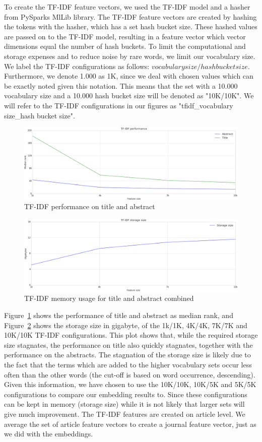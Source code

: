 \documentclass[../../Thesis.tex]{subfiles}
\begin{document}
\clearpage
{}
To create the TF-IDF feature vectors, we used the TF-IDF model and a hasher from PySparks MlLib library. The TF-IDF feature vectors are created by hashing the tokens with the hasher, which has a set hash bucket size. These hashed values are passed on to the TF-IDF model, resulting in a feature vector which vector dimensions equal the number of hash buckets. To limit the computational and storage expenses and to reduce noise by rare words, we limit our vocabulary size.
We label the TF-IDF configurations as follows: $vocabulary size/hash bucket size$. Furthermore, we denote 1.000 as 1K, since we deal with chosen values which can be exactly noted given this notation. This means that the set with a 10.000 vocabulary size and a 10.000 hash bucket size will be denoted as "10K/10K". We will refer to the TF-IDF configurations in our figures as "tfidf\_vocabulary size\_hash bucket size".
\begin{figure}[hbt]
\includegraphics[width=5in]{Plots/tfidf_selection_plot_performance}
\caption{TF-IDF performance on title and abstract}\label{figure:tfidfPerformance}
\end{figure}
\begin{figure}[hbt]
\includegraphics[width=5in]{Plots/tfidf_selection_plot_memory}
\caption{TF-IDF memory usage for title and abstract combined}\label{figure:tfidfMemory}
\end{figure}
\FloatBarrier
Figure~\ref{figure:tfidfPerformance} shows the performance of title and abstract as median rank, and Figure~\ref{figure:tfidfMemory} shows the storage size in gigabyte, of the 1k/1K, 4K/4K, 7K/7K and 10K/10K TF-IDF configurations. This plot shows that, while the required storage size stagnates, the performance on title also quickly stagnates, together with the performance on the abstracts. The stagnation of the storage size is likely due to the fact that the terms which are added to the higher vocabulary sets occur less often than the other words (the cut-off is based on word occurrence, descending). Given this information, we have chosen to use the 10K/10K, 10K/5K and 5K/5K configurations to compare our embedding results to. Since these configurations can be kept in memory (storage size) while it is not likely that larger sets will give much improvement. The TF-IDF features are created on article level. We average the set of article feature vectors to create a journal feature vector, just as we did with the embeddings. 
\end{document}
